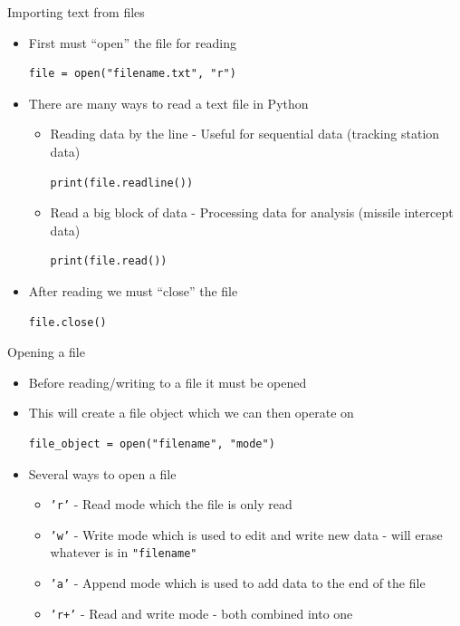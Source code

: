 \documentclass[11pt,professionalfonts]{beamer}
\begin{document}
\begin{frame}[fragile]{Importing text from files}
    \begin{itemize}
        \item First must ``open'' the file for reading
\begin{verbatim}
file = open("filename.txt", "r")
\end{verbatim}
        \item There are many ways to read a text file in Python
            \begin{itemize}
                \item Reading data by the line - Useful for sequential data (tracking station data)
\begin{verbatim}
print(file.readline()) 
\end{verbatim}
                \item Read a big block of data - Processing data for analysis (missile intercept data)
\begin{verbatim}
print(file.read())
\end{verbatim}
    
            \end{itemize}
        \item After reading we must ``close'' the file
            \begin{verbatim}
file.close()
            \end{verbatim}
    \end{itemize}
\end{frame}

\begin{frame}[fragile]{Opening a file}
    \begin{itemize}
        \item Before reading/writing to a file it must be opened
        \item This will create a file object which we can then operate on
            \begin{verbatim}
file_object = open("filename", "mode")
            \end{verbatim}
        \item Several ways to open a file
            \begin{itemize}
                \item \texttt{'r'} - Read mode which the file is only read
                \item \texttt{'w'} - Write mode which is used to edit and write new data - will erase whatever is in \texttt{"filename"}
                \item \texttt{'a'} - Append mode which is used to add data to the end of the file
                \item \texttt{'r+'} - Read and write mode - both combined into one
            \end{itemize}
    \end{itemize}
\end{frame}
\end{document}
